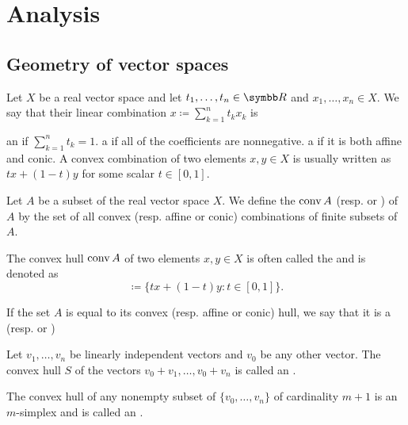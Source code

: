 \section{Analysis}\label{sec:analysis}
\subsection{Geometry of vector spaces}\label{subsec:geometry_of_vector_spaces}

\begin{definition}\label{def:real_linear_combinations}
  Let \( X \) be a real vector space and let \( t_1, \ldots, t_n \in \R \) and \( x_1, \ldots, x_n \in X \). We say that their linear combination \( x \coloneqq \sum_{k=1}^n t_k x_k \) is

  \begin{defenum}
     an  if \( \sum_{k=1}^n t_k = 1 \).
     a  if all of the coefficients are nonnegative.
     a  if it is both affine and conic. A convex combination of two elements \( x, y \in X \) is usually written as \( tx + (1-t)y \) for some scalar \( t \in [0, 1] \).
  \end{defenum}
\end{definition}

\begin{definition}\label{def:linear_combination_hulls}
  Let \( A \) be a subset of the real vector space \( X \). We define the  \( \operatorname{conv} A \) (resp.  or ) of \( A \) by the set of all convex (resp. affine or conic) combinations of finite subsets of \( A \).

  The convex hull \( \operatorname{conv} A \) of two elements \( x, y \in X \) is often called the  and is denoted as
  \begin{equation*}
    [x, y] \coloneqq \{ tx + (1-t)y \colon t \in [0, 1] \}.
  \end{equation*}

  If the set \( A \) is equal to its convex (resp. affine or conic) hull, we say that it is a  (resp.  or )
\end{definition}

\begin{definition}\label{def:simplex}
  Let \( v_1, \ldots, v_n \) be linearly independent vectors and \( v_0 \) be any other vector. The convex hull \( S \) of the vectors \( v_0 + v_1, \ldots, v_0 + v_n \) is called an .

  The convex hull of any nonempty subset of \( \{ v_0, \ldots, v_n \} \) of cardinality \( m + 1 \) is an \( m \)-simplex and is called an .
\end{definition}
